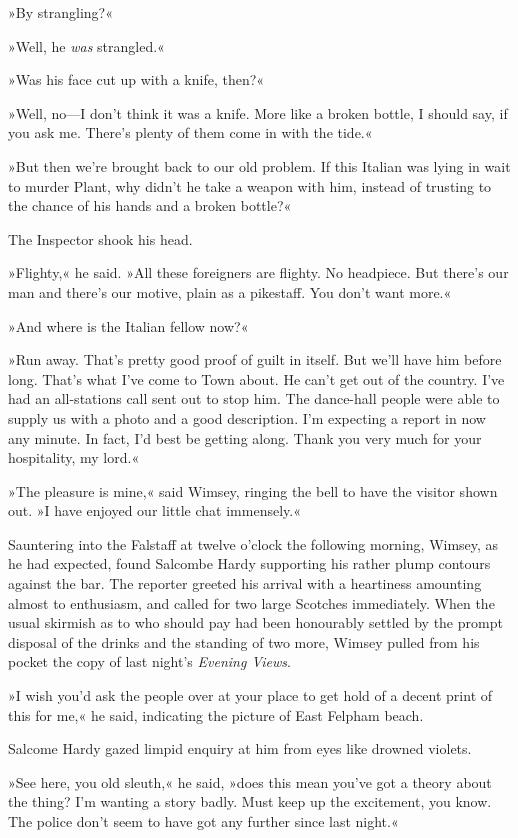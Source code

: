 »By strangling?«

»Well, he \textit{was} strangled.«

»Was his face cut up with a knife, then?«

»Well, no—I don't think it was a knife. More like a broken bottle, I should say, if you ask me. There's plenty of them come in with the tide.«

»But then we're brought back to our old problem. If this Italian was lying in wait to murder Plant, why didn't he take a weapon with him, instead of trusting to the chance of his hands and a broken bottle?«

The Inspector shook his head.

»Flighty,« he said. »All these foreigners are flighty. No headpiece. But there's our man and there's our motive, plain as a pikestaff. You don't want more.«

»And where is the Italian fellow now?«

»Run away. That's pretty good proof of guilt in itself. But we'll have him before long. That's what I've come to Town about. He can't get out of the country. I've had an all-stations call sent out to stop him. The dance-hall people were able to supply us with a photo and a good description. I'm expecting a report in now any minute. In fact, I'd best be getting along. Thank you very much for your hospitality, my lord.«

»The pleasure is mine,« said Wimsey, ringing the bell to have the visitor shown out. »I have enjoyed our little chat immensely.«

Sauntering into the Falstaff at twelve o'clock the following morning, Wimsey, as he had expected, found Salcombe Hardy supporting his rather plump contours against the bar. The reporter greeted his arrival with a heartiness amounting almost to enthusiasm, and called for two large Scotches immediately. When the usual skirmish as to who should pay had been honourably settled by the prompt disposal of the drinks and the standing of two more, Wimsey pulled from his pocket the copy of last night's \textit{Evening Views}.

»I wish you'd ask the people over at your place to get hold of a decent print of this for me,« he said, indicating the picture of East Felpham beach.

Salcome Hardy gazed limpid enquiry at him from eyes like drowned violets.

»See here, you old sleuth,« he said, »does this mean you've got a theory about the thing? I'm wanting a story badly. Must keep up the excitement, you know. The police don't seem to have got any further since last night.«

